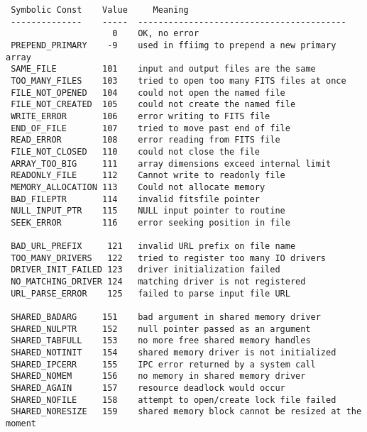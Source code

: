 \documentclass[11pt]{article}
\begin{document}
\begin{verbatim}
 Symbolic Const    Value     Meaning
 --------------    -----  -----------------------------------------
                     0    OK, no error
 PREPEND_PRIMARY    -9    used in ffiimg to prepend a new primary array
 SAME_FILE         101    input and output files are the same
 TOO_MANY_FILES    103    tried to open too many FITS files at once
 FILE_NOT_OPENED   104    could not open the named file
 FILE_NOT_CREATED  105    could not create the named file
 WRITE_ERROR       106    error writing to FITS file
 END_OF_FILE       107    tried to move past end of file
 READ_ERROR        108    error reading from FITS file
 FILE_NOT_CLOSED   110    could not close the file
 ARRAY_TOO_BIG     111    array dimensions exceed internal limit
 READONLY_FILE     112    Cannot write to readonly file
 MEMORY_ALLOCATION 113    Could not allocate memory
 BAD_FILEPTR       114    invalid fitsfile pointer
 NULL_INPUT_PTR    115    NULL input pointer to routine 
 SEEK_ERROR        116    error seeking position in file 

 BAD_URL_PREFIX     121   invalid URL prefix on file name 
 TOO_MANY_DRIVERS   122   tried to register too many IO drivers 
 DRIVER_INIT_FAILED 123   driver initialization failed 
 NO_MATCHING_DRIVER 124   matching driver is not registered 
 URL_PARSE_ERROR    125   failed to parse input file URL

 SHARED_BADARG     151    bad argument in shared memory driver
 SHARED_NULPTR     152    null pointer passed as an argument
 SHARED_TABFULL    153    no more free shared memory handles
 SHARED_NOTINIT    154    shared memory driver is not initialized
 SHARED_IPCERR     155    IPC error returned by a system call
 SHARED_NOMEM      156    no memory in shared memory driver
 SHARED_AGAIN      157    resource deadlock would occur
 SHARED_NOFILE     158    attempt to open/create lock file failed
 SHARED_NORESIZE   159    shared memory block cannot be resized at the moment


\end{verbatim}
\end{document}
